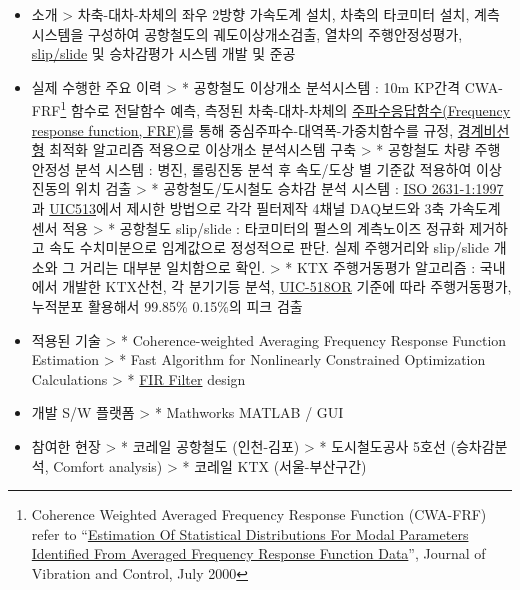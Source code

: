\documentclass[]{article}
\begin{document}
\begin{itemize}
\item
  소개 \textgreater{} 차축-대차-차체의 좌우 2방향 가속도계 설치, 차축의
  타코미터 설치, 계측시스템을 구성하여 공항철도의 궤도이상개소검출,
  열차의 주행안정성평가,
  \href{http://ieeexplore.ieee.org/xpl/login.jsp?tp=\&arnumber=264942\&url=http\%3A\%2F\%2Fieeexplore.ieee.org\%2Fxpls\%2Fabs_all.jsp\%3Farnumber\%3D264942}{slip/slide}
  및 승차감평가 시스템 개발 및 준공
\item
  실제 수행한 주요 이력 \textgreater{} * 공항철도 이상개소 분석시스템 :
  10m KP간격 CWA-FRF\footnote{Coherence Weighted Averaged Frequency
    Response Function (CWA-FRF) refer to
    ``\href{http://institute.lanl.gov/ei/shm/pubs/modal_stat_jvc_jul00.pdf}{Estimation
    Of Statistical Distributions For Modal Parameters Identified From
    Averaged Frequency Response Function Data}'', Journal of Vibration
    and Control, July 2000} 함수로 전달함수 예측, 측정된
  차축-대차-차체의
  \href{https://en.wikipedia.org/wiki/Frequency_response}{주파수응답함수(Frequency
  response function, FRF)}를 통해 중심주파수-대역폭-가중치함수를 규정,
  \href{http://www.scholarpedia.org/article/Boundary_value_problem}{경계비선형}
  최적화 알고리즘 적용으로 이상개소 분석시스템 구축 \textgreater{} *
  공항철도 차량 주행 안정성 분석 시스템 : 병진, 롤링진동 분석 후
  속도/도상 별 기준값 적용하여 이상진동의 위치 검출 \textgreater{} *
  공항철도/도시철도 승차감 분석 시스템 :
  \href{http://www.iso.org/iso/catalogue_detail.htm?csnumber=7612}{ISO
  2631-1:1997}과
  \href{http://www.uic.org/etf/codex/codex-detail.php?codeFiche=513\&langue_fiche=E}{UIC513}에서
  제시한 방법으로 각각 필터제작 4채널 DAQ보드와 3축 가속도계 센서 적용
  \textgreater{} * 공항철도 slip/slide : 타코미터의 펄스의 계측노이즈
  정규화 제거하고 속도 수치미분으로 임계값으로 정성적으로 판단. 실제
  주행거리와 slip/slide 개소와 그 거리는 대부분 일치함으로 확인.
  \textgreater{} * KTX 주행거동평가 알고리즘 : 국내에서 개발한 KTX산천,
  각 분기기등 분석,
  \href{http://www.uic.org/etf/codex/codex-detail.php?langue_fiche=E\&codeFiche=518}{UIC-518OR}
  기준에 따라 주행거동평가, 누적분포 활용해서 99.85\% 0.15\%의 피크 검출
\item
  적용된 기술 \textgreater{} * Coherence-weighted Averaging Frequency
  Response Function Estimation \textgreater{} * Fast Algorithm for
  Nonlinearly Constrained Optimization Calculations \textgreater{} *
  \href{https://en.wikipedia.org/wiki/Finite_impulse_response}{FIR
  Filter} design
\item
  개발 S/W 플랫폼 \textgreater{} * Mathworks MATLAB / GUI
\item
  참여한 현장 \textgreater{} * 코레일 공항철도 (인천-김포)
  \textgreater{} * 도시철도공사 5호선 (승차감분석, Comfort analysis)
  \textgreater{} * 코레일 KTX (서울-부산구간)
\end{itemize}
\end{document}
